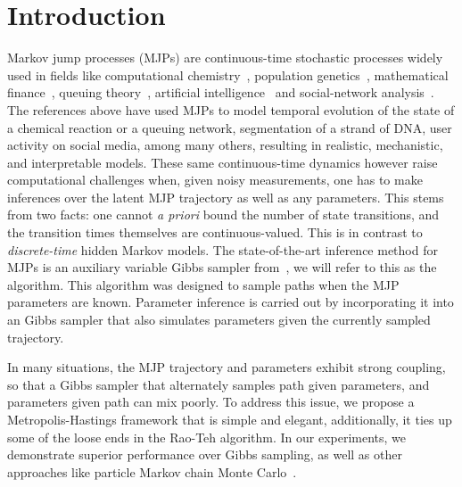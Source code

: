 
\section{Introduction}
\label{sec:intro}
Markov jump processes (MJPs) are continuous-time stochastic processes 
widely used in fields like computational chemistry~\cite{gillespie97}, 
population genetics~\cite{FearnSher2006}, mathematical finance~\cite{Elliott06}, 
queuing theory~\cite{Breuer2003}, artificial intelligence~\cite{XuShe10} and
social-network analysis~\cite{pan2016markov}. %
The references above have used MJPs to model temporal evolution of the state of a 
chemical reaction 
or a queuing network, segmentation of a strand of DNA, user activity on social 
media, among many others,
resulting in 
realistic, mechanistic, and interpretable models. %
These same continuous-time dynamics however raise computational
challenges when, given noisy 
measurements, one has to make inferences over the latent MJP 
trajectory as well as any parameters. 
This stems from two facts: one cannot {\em a priori} 
bound the number of state transitions, and the transition times themselves
are continuous-valued. This is in contrast to 
{\em discrete-time} hidden Markov models. %
The state-of-the-art inference method for MJPs is an auxiliary variable 
Gibbs sampler from~\cite{RaoTeh13}, we will refer to this as the {\algname} 
algorithm. This  algorithm was designed to sample paths when the MJP parameters
are known. Parameter inference is carried out by 
incorporating it into an Gibbs sampler that also simulates
parameters given the currently sampled trajectory. 

In many situations, the MJP trajectory and parameters exhibit 
strong coupling, so that a Gibbs sampler that alternately samples path given
parameters, and parameters given path can mix poorly.  
To address this issue, we propose a Metropolis-Hastings framework 
that is simple and elegant, additionally,
it ties up some of the loose ends in the Rao-Teh algorithm.
In our experiments, we demonstrate superior 
performance over Gibbs sampling, as well as other approaches like 
particle Markov chain Monte Carlo~\cite{Andrieu10}.

